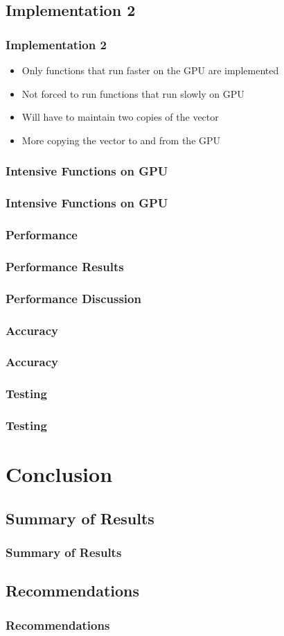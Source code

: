 \documentclass{beamer}
\newcommand\pro{\item[$+$]}
\newcommand\con{\item[$-$]}
\begin{document}
\subsection{Implementation 2}
\begin{frame}
\frametitle{Implementation 2}
\begin{itemize}
\pro Only functions that run faster on the GPU are implemented
\pro Not forced to run functions that run slowly on GPU
\con Will have to maintain two copies of the vector
\con More copying the vector to and from the GPU
\end{itemize}
\end{frame}

\subsubsection{Intensive Functions on GPU}
\begin{frame}
\frametitle{Intensive Functions on GPU}
\end{frame}

\subsubsection{Performance}
\begin{frame}
\frametitle{Performance Results}
\end{frame}

\begin{frame}
\frametitle{Performance Discussion}
\end{frame}

\subsubsection{Accuracy}
\begin{frame}
\frametitle{Accuracy}
\end{frame}

\subsubsection{Testing}
\begin{frame}
\frametitle{Testing}
\end{frame}

\section{Conclusion}
\subsection{Summary of Results}
\begin{frame}
\frametitle{Summary of Results}
\end{frame}

\subsection{Recommendations}
\begin{frame}
\frametitle{Recommendations}
\end{frame}
\end{document}
